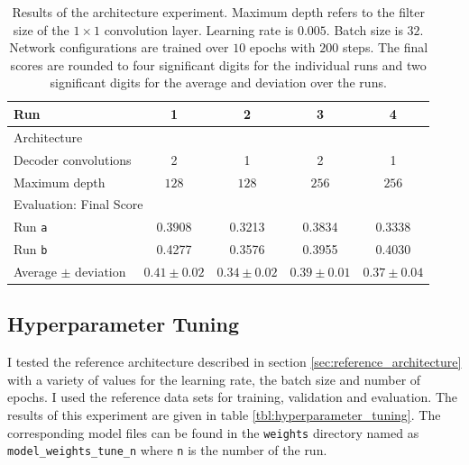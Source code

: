 \documentclass[11pt, onecolumn, oneside, reqno]{article}
\begin{document}
{{\renewcommand{\arraystretch}{2}%
\begin{table}
\centering
\begin{tabular}{|l|c|c|c|c|}
\hline 
Run & 1 & 2 & 3 & 4 \\
\hline
\multicolumn{5}{l}{Architecture}\\
\hline
Decoder convolutions & 2 & 1 & 2 & 1 \\
Maximum depth   & $128$ & $128$ & $256$ & $256$ \\
\hline
\multicolumn{5}{l}{Evaluation: Final Score}\\
\hline
Run \texttt{a} & 0.3908 & 0.3213 & 0.3834 & 0.3338 \\
Run \texttt{b} & 0.4277 & 0.3576 & 0.3955 & 0.4030 \\
\hline
Average $\pm$ deviation & $0.41 \pm 0.02$ & $0.34 \pm 0.02$ & $0.39 \pm 0.01$ & $0.37 \pm 0.04$ \\
\hline 
\end{tabular}
\caption[Architecture experiment]{Results of the architecture experiment. Maximum depth refers to the filter size of the $1 \times 1$ convolution layer. Learning rate is $0.005$. Batch size is $32$. Network configurations are trained over $10$ epochs with $200$ steps. The final scores are rounded to four significant digits for the individual runs and two significant digits for the average and deviation over the runs.}
\label{tbl:architecture_experiments}
\end{table}

\subsection{Hyperparameter Tuning}
I tested the reference architecture described in section \ref{sec:reference_architecture} with a variety of values for the learning rate, the batch size and number of epochs. I used the reference data sets for training, validation and evaluation. The results of this experiment are given in table \ref{tbl:hyperparameter_tuning}. The corresponding model files can be found in the \texttt{weights} directory named as \texttt{model\_weights\_tune\_n} where \texttt{n} is the number of the run.

}}
\end{document}
